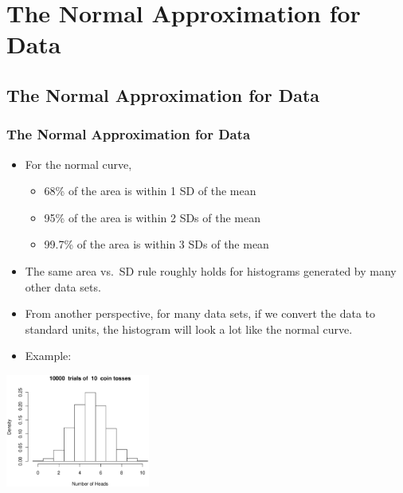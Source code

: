 \documentclass[t]{beamer}
\begin{document}
\section[Normal Approximation]{The Normal Approximation for Data}
\subsection[Normal Approximation]{The Normal Approximation for Data}
\begin{frame}[t]\frametitle{The Normal Approximation for Data}
{\small
\begin{itemize}
\item For the normal curve, 
   \begin{itemize} 
   \item 68\% of the area is within 1 SD of the mean
   \item 95\% of the area is within 2 SDs of the mean
   \item 99.7\% of the area is within 3 SDs of the mean
   \end{itemize}
\item The same area vs.~SD rule roughly holds for histograms generated by 
  many other data sets.
\item From another perspective, for many data sets, if we convert the data
  to standard units, the histogram will look a lot like the normal curve.
\item Example:  \vspace{-.3in}
\end{itemize}
\begin{center}
\includegraphics[height=3.7cm]{CoinHistogram.eps}
\end{center}
}
\end{frame}
\end{document}
